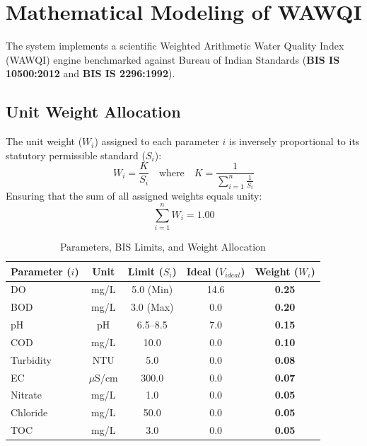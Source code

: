 \documentclass[conference]{IEEEtran}
\begin{document}
\section{Mathematical Modeling of WAWQI}
The system implements a scientific Weighted Arithmetic Water Quality Index (WAWQI) engine benchmarked against Bureau of Indian Standards (\textbf{BIS IS 10500:2012} and \textbf{BIS IS 2296:1992}).

\subsection{Unit Weight Allocation}
The unit weight ($W_i$) assigned to each parameter $i$ is inversely proportional to its statutory permissible standard ($S_i$):
\begin{equation}
W_i = \frac{K}{S_i} \quad \text{where} \quad K = \frac{1}{\sum_{i=1}^{n} \frac{1}{S_i}}
\end{equation}
Ensuring that the sum of all assigned weights equals unity:
\begin{equation}
\sum_{i=1}^{n} W_i = 1.00
\end{equation}

\begin{table}[htbp]
\caption{Parameters, BIS Limits, and Weight Allocation}
\begin{center}
\begin{tabular}{lcccc}
\toprule
\textbf{Parameter ($i$)} & \textbf{Unit} & \textbf{Limit ($S_i$)} & \textbf{Ideal ($V_{ideal}$)} & \textbf{Weight ($W_i$)} \\
\midrule
DO & mg/L & 5.0 (Min) & 14.6 & \textbf{0.25} \\
BOD & mg/L & 3.0 (Max) & 0.0 & \textbf{0.20} \\
pH & pH & 6.5--8.5 & 7.0 & \textbf{0.15} \\
COD & mg/L & 10.0 & 0.0 & \textbf{0.10} \\
Turbidity & NTU & 5.0 & 0.0 & \textbf{0.08} \\
EC & $\mu$S/cm & 300.0 & 0.0 & \textbf{0.07} \\
Nitrate & mg/L & 1.0 & 0.0 & \textbf{0.05} \\
Chloride & mg/L & 50.0 & 0.0 & \textbf{0.05} \\
TOC & mg/L & 3.0 & 0.0 & \textbf{0.05} \\
\bottomrule
\end{tabular}
\end{center}
\end{table}
\end{document}
